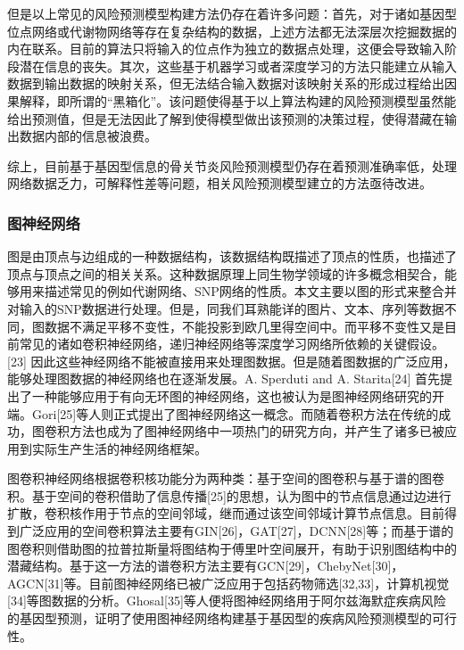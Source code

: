 \documentclass[
]{article}
\begin{document}
但是以上常见的风险预测模型构建方法仍存在着许多问题：首先，对于诸如基因型位点网络或代谢物网络等存在复杂结构的数据，上述方法都无法深层次挖掘数据的内在联系。目前的算法只将输入的位点作为独立的数据点处理，这便会导致输入阶段潜在信息的丧失。其次，这些基于机器学习或者深度学习的方法只能建立从输入数据到输出数据的映射关系，但无法结合输入数据对该映射关系的形成过程给出因果解释，即所谓的``黑箱化''。该问题使得基于以上算法构建的风险预测模型虽然能给出预测值，但是无法因此了解到使得模型做出该预测的决策过程，使得潜藏在输出数据内部的信息被浪费。

综上，目前基于基因型信息的骨关节炎风险预测模型仍存在着预测准确率低，处理网络数据乏力，可解释性差等问题，相关风险预测模型建立的方法亟待改进。

\hypertarget{ux56feux795eux7ecfux7f51ux7edc-1}{%
\subsubsection{图神经网络}\label{ux56feux795eux7ecfux7f51ux7edc-1}}

图是由顶点与边组成的一种数据结构，该数据结构既描述了顶点的性质，也描述了顶点与顶点之间的相关关系。这种数据原理上同生物学领域的许多概念相契合，能够用来描述常见的例如代谢网络、SNP网络的性质。本文主要以图的形式来整合并对输入的SNP数据进行处理。但是，同我们耳熟能详的图片、文本、序列等数据不同，图数据不满足平移不变性，不能投影到欧几里得空间中。而平移不变性又是目前常见的诸如卷积神经网络，递归神经网络等深度学习网络所依赖的关键假设。{[}23{]}
因此这些神经网络不能被直接用来处理图数据。但是随着图数据的广泛应用，能够处理图数据的神经网络也在逐渐发展。A.
Sperduti and A. Starita{[}24{]}
首先提出了一种能够应用于有向无环图的神经网络，这也被认为是图神经网络研究的开端。Gori{[}25{]}等人则正式提出了图神经网络这一概念。而随着卷积方法在传统的成功，图卷积方法也成为了图神经网络中一项热门的研究方向，并产生了诸多已被应用到实际生产生活的神经网络框架。

图卷积神经网络根据卷积核功能分为两种类：基于空间的图卷积与基于谱的图卷积。基于空间的卷积借助了信息传播{[}25{]}的思想，认为图中的节点信息通过边进行扩散，卷积核作用于节点的空间邻域，继而通过该空间邻域计算节点信息。目前得到广泛应用的空间卷积算法主要有GIN{[}26{]}，GAT{[}27{]}，DCNN{[}28{]}等；而基于谱的图卷积则借助图的拉普拉斯量将图结构于傅里叶空间展开，有助于识别图结构中的潜藏结构。基于这一方法的谱卷积方法主要有GCN{[}29{]}，ChebyNet{[}30{]}，AGCN{[}31{]}等。目前图神经网络已被广泛应用于包括药物筛选{[}32,33{]}，计算机视觉{[}34{]}等图数据的分析。Ghosal{[}35{]}等人便将图神经网络用于阿尔兹海默症疾病风险的基因型预测，证明了使用图神经网络构建基于基因型的疾病风险预测模型的可行性。
\end{document}
